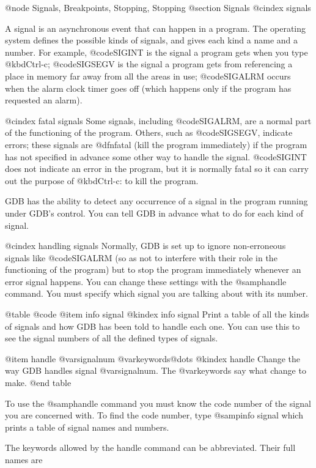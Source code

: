 @node Signals, Breakpoints, Stopping, Stopping
@section Signals
@cindex signals

A signal is an asynchronous event that can happen in a program.  The
operating system defines the possible kinds of signals, and gives each kind
a name and a number.  For example, @code{SIGINT} is the signal a program
gets when you type @kbd{Ctrl-c}; @code{SIGSEGV} is the signal a program
gets from referencing a place in memory far away from all the areas in use;
@code{SIGALRM} occurs when the alarm clock timer goes off (which happens
only if the program has requested an alarm).

@cindex fatal signals
Some signals, including @code{SIGALRM}, are a normal part of the
functioning of the program.  Others, such as @code{SIGSEGV}, indicate
errors; these signals are @dfn{fatal} (kill the program immediately) if the
program has not specified in advance some other way to handle the signal.
@code{SIGINT} does not indicate an error in the program, but it is normally
fatal so it can carry out the purpose of @kbd{Ctrl-c}: to kill the program.

GDB has the ability to detect any occurrence of a signal in the program
running under GDB's control.  You can tell GDB in advance what to do for
each kind of signal.

@cindex handling signals
Normally, GDB is set up to ignore non-erroneous signals like @code{SIGALRM}
(so as not to interfere with their role in the functioning of the program)
but to stop the program immediately whenever an error signal happens.
You can change these settings with the @samp{handle} command.  You must
specify which signal you are talking about with its number.

@table @code
@item info signal
@kindex info signal
Print a table of all the kinds of signals and how GDB has been told to
handle each one.  You can use this to see the signal numbers of all
the defined types of signals.

@item handle @var{signalnum} @var{keywords}@dots{}
@kindex handle
Change the way GDB handles signal @var{signalnum}.  The @var{keywords}
say what change to make.
@end table

To use the @samp{handle} command you must know the code number of the
signal you are concerned with.  To find the code number, type @samp{info
signal} which prints a table of signal names and numbers.

The keywords allowed by the handle command can be abbreviated.  Their full
names are

